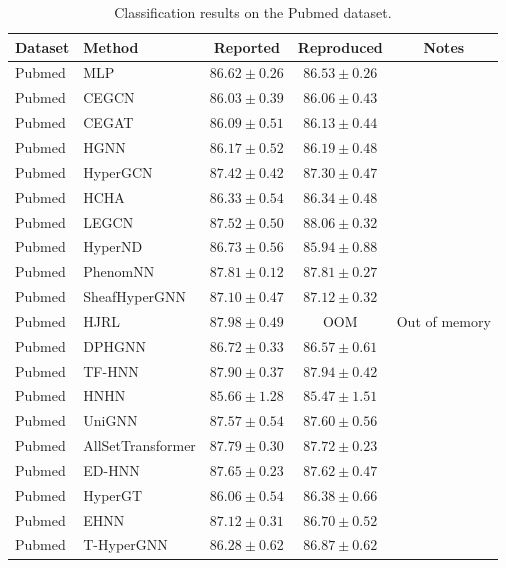 \vspace{3em} 

\begin{table}[H]
    \centering \small
    \renewcommand{\arraystretch}{1.12} 
    \begin{tabular}{llccc}
        \toprule
        Dataset & Method & Reported & Reproduced & Notes \\
        \midrule
        Pubmed & MLP & \(86.62 \pm 0.26\) & \(86.53 \pm 0.26\) & \\
        Pubmed & CEGCN & \(86.03 \pm 0.39\) & \(86.06 \pm 0.43\) & \\
        Pubmed & CEGAT & \(86.09 \pm 0.51\) & \(86.13 \pm 0.44\) & \\
        \grprule
        Pubmed & HGNN & \(86.17 \pm 0.52\) & \(86.19 \pm 0.48\) & \\
        Pubmed & HyperGCN & \(87.42 \pm 0.42\) & \(87.30 \pm 0.47\) & \\
        Pubmed & HCHA & \(86.33 \pm 0.54\) & \(86.34 \pm 0.48\) & \\
        Pubmed & LEGCN & \(87.52 \pm 0.50\) & \(88.06 \pm 0.32\) & \\
        Pubmed & HyperND & \(86.73 \pm 0.56\) & \(85.94 \pm 0.88\) & \\
        Pubmed & PhenomNN & \(87.81 \pm 0.12\) & \(87.81 \pm 0.27\) & \\
        Pubmed & SheafHyperGNN & \(87.10 \pm 0.47\) & \(87.12 \pm 0.32\) & \\
        Pubmed & HJRL & \(87.98 \pm 0.49\) & OOM & Out of memory \\
        Pubmed & DPHGNN & \(86.72 \pm 0.33\) & \(86.57 \pm 0.61\) & \\
        Pubmed & TF-HNN & \(87.90 \pm 0.37\) & \(87.94 \pm 0.42\) & \\
        \grprule
        Pubmed & HNHN & \(85.66 \pm 1.28\) & \(85.47 \pm 1.51\) & \\
        Pubmed & UniGNN & \(87.57 \pm 0.54\) & \(87.60 \pm 0.56\) & \\
        Pubmed & AllSetTransformer & \(87.79 \pm 0.30\) & \(87.72 \pm 0.23\) & \\
        Pubmed & ED-HNN & \(87.65 \pm 0.23\) & \(87.62 \pm 0.47\) & \\
        Pubmed & HyperGT & \(86.06 \pm 0.54\) & \(86.38 \pm 0.66\) & \\
        \grprule
        Pubmed & EHNN & \(87.12 \pm 0.31\) & \(86.70 \pm 0.52\) & \\
        Pubmed & T-HyperGNN & \(86.28 \pm 0.62\) & \(86.87 \pm 0.62\) & \\
        \bottomrule
    \end{tabular}
    \caption{Classification results on the Pubmed dataset.}
\end{table}

